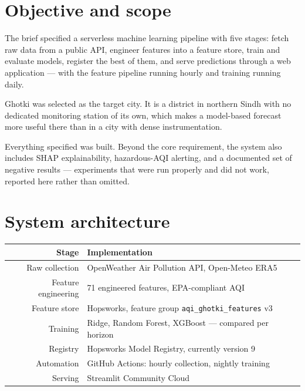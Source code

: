 \documentclass[11pt,a4paper]{article}
\begin{document}
\section{Objective and scope}

The brief specified a serverless machine learning pipeline with five
stages: fetch raw data from a public API, engineer features into a
feature store, train and evaluate models, register the best of them,
and serve predictions through a web application --- with the feature
pipeline running hourly and training running daily.

Ghotki was selected as the target city. It is a district in northern
Sindh with no dedicated monitoring station of its own, which makes a
model-based forecast more useful there than in a city with dense
instrumentation.

Everything specified was built. Beyond the core requirement, the system
also includes SHAP explainability, hazardous-AQI alerting, and a
documented set of negative results --- experiments that were run
properly and did not work, reported here rather than omitted.

\section{System architecture}

\begin{center}
\small
\begin{tabular}{rl}
\toprule
\textbf{Stage} & \textbf{Implementation} \\
\midrule
Raw collection & OpenWeather Air Pollution API, Open-Meteo ERA5 \\
Feature engineering & 71 engineered features, EPA-compliant AQI \\
Feature store & Hopsworks, feature group \texttt{aqi\_ghotki\_features} v3 \\
Training & Ridge, Random Forest, XGBoost --- compared per horizon \\
Registry & Hopsworks Model Registry, currently version 9 \\
Automation & GitHub Actions: hourly collection, nightly training \\
Serving & Streamlit Community Cloud \\
\bottomrule
\end{tabular}
\end{center}
\end{document}
